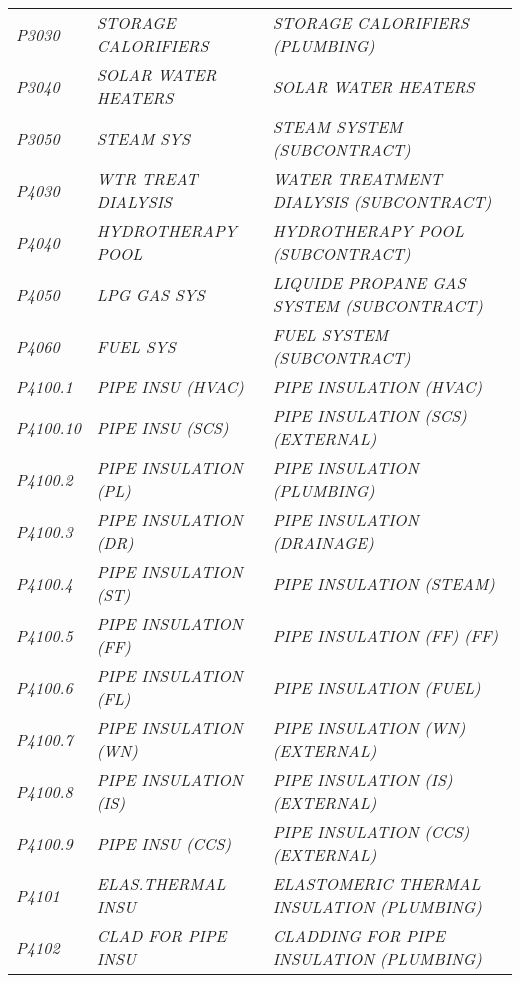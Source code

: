\begin{landscape}
\begin{longtable}[l]{l%
                  l|%
                  l|}
\itshape P3030       &\itshape STORAGE CALORIFIERS    &\itshape STORAGE CALORIFIERS (PLUMBING)   \\
\itshape P3040       &\itshape SOLAR WATER HEATERS    &\itshape SOLAR WATER HEATERS   \\
\itshape P3050       &\itshape STEAM SYS   			  &\itshape STEAM SYSTEM (SUBCONTRACT)   \\
\itshape P4030       &\itshape WTR TREAT DIALYSIS     &\itshape WATER TREATMENT DIALYSIS (SUBCONTRACT)   \\
\itshape P4040       &\itshape HYDROTHERAPY POOL      &\itshape HYDROTHERAPY POOL (SUBCONTRACT)   \\
\itshape P4050       &\itshape LPG GAS SYS            &\itshape LIQUIDE PROPANE GAS SYSTEM (SUBCONTRACT)   \\
\itshape P4060       &\itshape FUEL SYS               &\itshape FUEL SYSTEM (SUBCONTRACT)   \\
\itshape P4100.1     &\itshape PIPE INSU (HVAC)       &\itshape PIPE INSULATION (HVAC)   \\
\itshape P4100.10    &\itshape PIPE INSU (SCS)        &\itshape PIPE INSULATION (SCS) (EXTERNAL)   \\
\itshape P4100.2     &\itshape PIPE INSULATION (PL)   &\itshape PIPE INSULATION (PLUMBING)   \\
\itshape P4100.3     &\itshape PIPE INSULATION (DR)   &\itshape PIPE INSULATION (DRAINAGE)   \\
\itshape P4100.4     &\itshape PIPE INSULATION (ST)   &\itshape PIPE INSULATION (STEAM)   \\
\itshape P4100.5     &\itshape PIPE INSULATION (FF)   &\itshape PIPE INSULATION (FF) (FF)   \\
\itshape P4100.6     &\itshape PIPE INSULATION (FL)   &\itshape PIPE INSULATION (FUEL)   \\
\itshape P4100.7     &\itshape PIPE INSULATION (WN)   &\itshape PIPE INSULATION (WN) (EXTERNAL)   \\
\itshape P4100.8     &\itshape PIPE INSULATION (IS)   &\itshape PIPE INSULATION (IS) (EXTERNAL)   \\
\itshape P4100.9     &\itshape PIPE INSU (CCS)   	  &\itshape PIPE INSULATION (CCS) (EXTERNAL)   \\
\itshape P4101       &\itshape ELAS.THERMAL INSU      &\itshape ELASTOMERIC THERMAL INSULATION (PLUMBING)   \\
\itshape P4102       &\itshape CLAD FOR PIPE INSU     &\itshape CLADDING FOR PIPE INSULATION (PLUMBING)   \\

\end{longtable}
\end{landscape}
